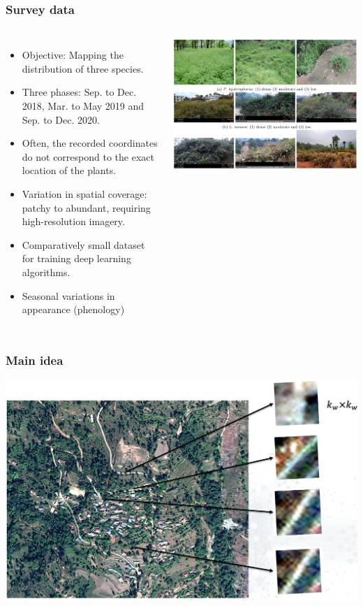 \documentclass[xcolor=table,xcolor=dvipsnames]{beamer}
\begin{document}
\begin{frame}
\frametitle{Survey data} 
\begin{columns}[c]
\begin{itemize}
\item Objective: Mapping the distribution of three species.
\item Three phases: Sep. to Dec. 2018, Mar. to May 2019 and Sep. to Dec. 2020.
\item Often, the recorded coordinates do not correspond to the exact location of the plants.
\item Variation in spatial coverage: patchy to abundant, requiring high-resolution imagery.
\item Comparatively small dataset for training deep learning algorithms.
\item Seasonal variations in appearance (phenology)
\end{itemize}

\vspace{-.2cm}
\centering
\includegraphics[width=\textwidth]{figs/density.png}
\end{columns}
\end{frame}
\begin{frame}
\frametitle{Main idea} 
{
\centering
\includegraphics[width=\textwidth]{figs/idea.png}
}
\end{frame}
\end{document}
